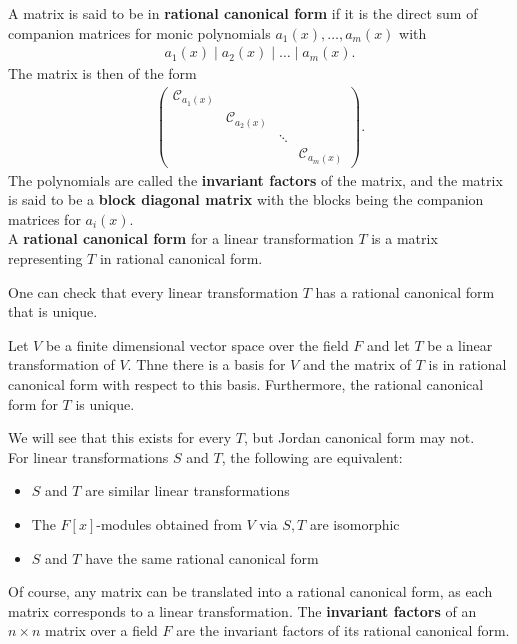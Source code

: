 \documentclass{memoir}
\begin{document}
\begin{defn}
	A matrix is said to be in \textbf{rational canonical form} if it is the direct sum of companion matrices for monic polynomials \(a_1(x),\ldots,a_m(x)\) with
	\begin{align*}
		a_1(x) \mid a_2(x) \mid \ldots \mid a_m(x).
	\end{align*}
	The matrix is then of the form
	\begin{align*}
		\begin{pmatrix} 
			\mathcal{C}_{a_1(x)} & & & \\
			& \mathcal{C}_{a_2(x)} & & \\
			& & \ddots & \\
			& & & \mathcal{C}_{a_m(x)}
		\end{pmatrix}.
	\end{align*}
	The polynomials are called the \textbf{invariant factors} of the matrix, and the matrix is said to be a \textbf{block diagonal matrix} with the blocks being the companion matrices for \(a_i(x)\).\\

	A \textbf{rational canonical form} for a linear transformation \(T\) is a matrix representing \(T\) in rational canonical form.
\end{defn}
One can check that every linear transformation \(T\) has a rational canonical form that is unique.

\begin{thm}
	Let \(V\) be a finite dimensional vector space over the field \(F\) and let \(T\) be a linear transformation of \(V\). Thne there is a basis for \(V\) and the matrix of \(T\) is in rational canonical form with respect to this basis. Furthermore, the rational canonical form for \(T\) is unique.
\end{thm}
We will see that this exists for every \(T\), but Jordan canonical form may not.\\

For linear transformations \(S\) and \(T\), the following are equivalent:
\begin{itemize}
	\item \(S\) and \(T\) are similar linear transformations
	\item The \(F[x]\)-modules obtained from \(V\) via \(S,T\) are isomorphic
	\item \(S\) and \(T\) have the same rational canonical form
\end{itemize}
Of course, any matrix can be translated into a rational canonical form, as each matrix corresponds to a linear transformation. The \textbf{invariant factors} of an \(n\times n\) matrix over a field \(F\) are the invariant factors of its rational canonical form.
\end{document}
